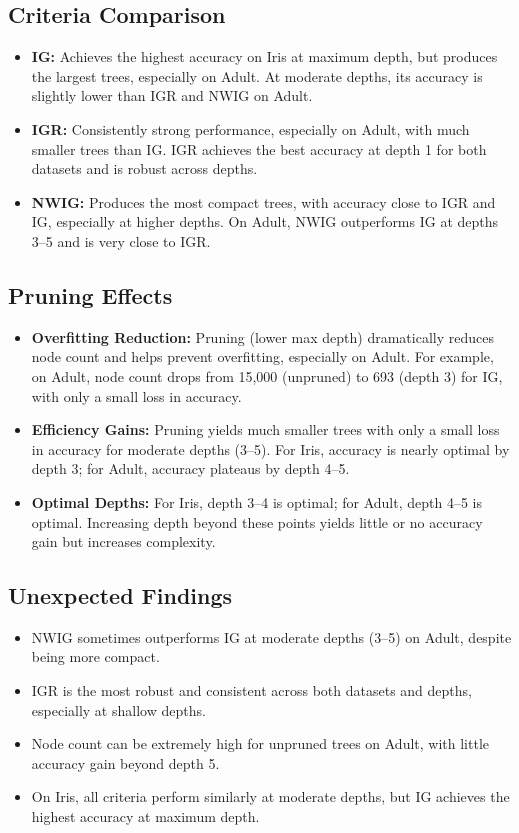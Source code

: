 \documentclass{article}
\begin{document}
\subsection*{Criteria Comparison}
\begin{itemize}
    \item \textbf{IG:} Achieves the highest accuracy on Iris at maximum depth, but produces the largest trees, especially on Adult. At moderate depths, its accuracy is slightly lower than IGR and NWIG on Adult.
    \item \textbf{IGR:} Consistently strong performance, especially on Adult, with much smaller trees than IG. IGR achieves the best accuracy at depth 1 for both datasets and is robust across depths.
    \item \textbf{NWIG:} Produces the most compact trees, with accuracy close to IGR and IG, especially at higher depths. On Adult, NWIG outperforms IG at depths 3--5 and is very close to IGR.
\end{itemize}

\subsection*{Pruning Effects}
\begin{itemize}
    \item \textbf{Overfitting Reduction:} Pruning (lower max depth) dramatically reduces node count and helps prevent overfitting, especially on Adult. For example, on Adult, node count drops from 15,000 (unpruned) to 693 (depth 3) for IG, with only a small loss in accuracy.
    \item \textbf{Efficiency Gains:} Pruning yields much smaller trees with only a small loss in accuracy for moderate depths (3--5). For Iris, accuracy is nearly optimal by depth 3; for Adult, accuracy plateaus by depth 4--5.
    \item \textbf{Optimal Depths:} For Iris, depth 3--4 is optimal; for Adult, depth 4--5 is optimal. Increasing depth beyond these points yields little or no accuracy gain but increases complexity.
\end{itemize}

\subsection*{Unexpected Findings}
\begin{itemize}
    \item NWIG sometimes outperforms IG at moderate depths (3--5) on Adult, despite being more compact.
    \item IGR is the most robust and consistent across both datasets and depths, especially at shallow depths.
    \item Node count can be extremely high for unpruned trees on Adult, with little accuracy gain beyond depth 5.
    \item On Iris, all criteria perform similarly at moderate depths, but IG achieves the highest accuracy at maximum depth.
\end{itemize}
\end{document}
